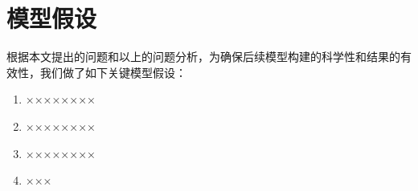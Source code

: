 \section{模型假设}
根据本文提出的问题和以上的问题分析，为确保后续模型构建的科学性和结果的有效性，我们做了如下关键模型假设：

\begin{enumerate}
    \item ××××××××
    \item ××××××××
    \item ××××××××
    \item ××× %
\end{enumerate}